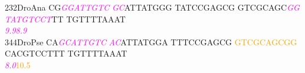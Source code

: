 \documentclass[11pt,twoside,reqno,a4paper]{article}
\begin{document}
{232\hspace*{1\charwidth}DroAna	CG\textit{\textcolor{magenta}{G}}\textit{\textcolor{magenta}{G}}\textit{\textcolor{magenta}{A}}\textit{\textcolor{magenta}{T}}\textit{\textcolor{magenta}{T}}\textit{\textcolor{magenta}{G}}\textit{\textcolor{magenta}{T}}\textit{\textcolor{magenta}{C}}	\textit{\textcolor{magenta}{G}}\textit{\textcolor{magenta}{C}}ATTATGGG	TATCCGAGCG	GTCGCAGC\textit{\textcolor{magenta}{G}}\textit{\textcolor{magenta}{G}}	\textit{\textcolor{magenta}{T}}\textit{\textcolor{magenta}{A}}\textit{\textcolor{magenta}{T}}\textit{\textcolor{magenta}{G}}\textit{\textcolor{magenta}{T}}\textit{\textcolor{magenta}{C}}\textit{\textcolor{magenta}{C}}\textit{\textcolor{magenta}{T}}TT	TGTTTTAAAT	\\
\hspace*{4\charwidth}\hspace*{7\charwidth}\hspace*{2\charwidth}\textit{\textcolor{magenta}{9.9}}\hspace*{1\charwidth}\hspace*{1\charwidth}\hspace*{1\charwidth}\hspace*{33\charwidth}\textit{\textcolor{magenta}{8.9}}\hspace*{1\charwidth}\hspace*{1\charwidth}\hspace*{1\charwidth}\\
344\hspace*{1\charwidth}DroPse	CA\textit{\textcolor{magenta}{G}}\textit{\textcolor{magenta}{C}}\textit{\textcolor{magenta}{A}}\textit{\textcolor{magenta}{T}}\textit{\textcolor{magenta}{T}}\textit{\textcolor{magenta}{G}}\textit{\textcolor{magenta}{T}}\textit{\textcolor{magenta}{C}}	\textit{\textcolor{magenta}{A}}\textit{\textcolor{magenta}{C}}ATTATGGA	TTTCCGAGCG	\textcolor{orange}{G}\textcolor{orange}{T}\textcolor{orange}{C}\textcolor{orange}{G}\textcolor{orange}{C}\textcolor{orange}{A}\textcolor{orange}{G}\textcolor{orange}{C}\textcolor{orange}{G}\textcolor{orange}{G}	CACGTCCTTT	TGTTTTAAAT	\\
\hspace*{4\charwidth}\hspace*{7\charwidth}\hspace*{2\charwidth}\textit{\textcolor{magenta}{8.0}}\hspace*{1\charwidth}\hspace*{1\charwidth}\hspace*{1\charwidth}\hspace*{25\charwidth}\textcolor{orange}{10.5}\hspace*{1\charwidth}\hspace*{1\charwidth}\hspace*{1\charwidth}\\
}
\end{document}
